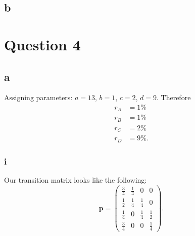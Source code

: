 \documentclass{article}
\begin{document}
\subsection{b}


\pagebreak
\section{Question 4}
\subsection{a}
Assigning parameters: $a = 13$, $b=1$, $c=2$, $d=9$. Therefore
\begin{align}
    r_A &= 1\% \\
    r_B &= 1\% \\
    r_C &= 2\% \\
    r_D &= 9\%. 
\end{align}

\subsubsection{i}
Our transition matrix looks like the following:
\begin{equation}
    \mathbf{p} = \begin{pmatrix}
        \frac{3}{4} & \frac{1}{4} & 0 & 0 \\
        \frac{1}{2} & \frac{1}{4} & \frac{1}{4} & 0 \\
        \frac{1}{4} & 0 & \frac{1}{4} & \frac{1}{2} \\
        \frac{3}{4} & 0 & 0 & \frac{1}{4}
    \end{pmatrix}.
\end{equation}
\end{document}
